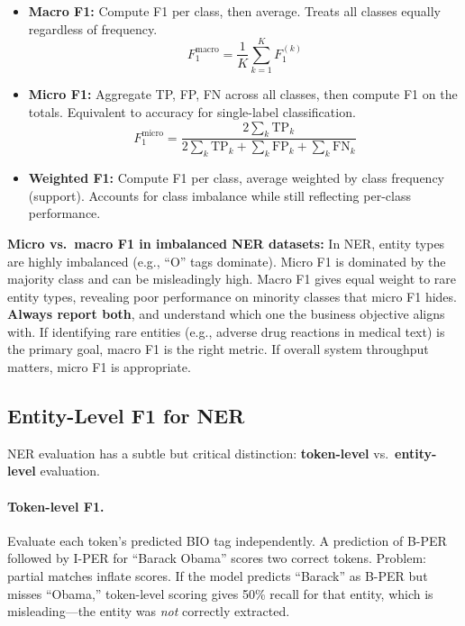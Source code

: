 \begin{itemize}
    \item \textbf{Macro F1:} Compute F1 per class, then average.  Treats all
          classes equally regardless of frequency.
          \[
              F_1^{\text{macro}} = \frac{1}{K}\sum_{k=1}^{K} F_1^{(k)}
          \]
    \item \textbf{Micro F1:} Aggregate TP, FP, FN across all classes, then
          compute F1 on the totals.  Equivalent to accuracy for single-label
          classification.
          \[
              F_1^{\text{micro}} = \frac{2\sum_k\text{TP}_k}{2\sum_k\text{TP}_k + \sum_k\text{FP}_k + \sum_k\text{FN}_k}
          \]
    \item \textbf{Weighted F1:} Compute F1 per class, average weighted by class
          frequency (support).  Accounts for class imbalance while still
          reflecting per-class performance.
\end{itemize}

\begin{warningbox}
\textbf{Micro vs.\ macro F1 in imbalanced NER datasets:}
In NER, entity types are highly imbalanced (e.g., ``O'' tags dominate).  Micro
F1 is dominated by the majority class and can be misleadingly high.  Macro F1
gives equal weight to rare entity types, revealing poor performance on minority
classes that micro F1 hides.  \textbf{Always report both}, and understand which
one the business objective aligns with.  If identifying rare entities (e.g.,
adverse drug reactions in medical text) is the primary goal, macro F1 is the
right metric.  If overall system throughput matters, micro F1 is appropriate.
\end{warningbox}

\subsection{Entity-Level F1 for NER}
\label{sec:ner_eval}

NER evaluation has a subtle but critical distinction: \textbf{token-level} vs.\
\textbf{entity-level} evaluation.

\paragraph{Token-level F1.}
Evaluate each token's predicted BIO tag independently.  A prediction of B-PER
followed by I-PER for ``Barack Obama'' scores two correct tokens.  Problem:
partial matches inflate scores.  If the model predicts ``Barack'' as B-PER but
misses ``Obama,'' token-level scoring gives 50\% recall for that entity, which
is misleading---the entity was \emph{not} correctly extracted.

